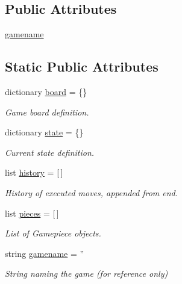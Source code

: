 \subsection*{Public Attributes}
\begin{DoxyCompactItemize}
\item 
\hyperlink{classgg__arch_1_1boardgame_1_1_boardgame_add740b057e0253407caaecd570f67291}{gamename}
\end{DoxyCompactItemize}
\subsection*{Static Public Attributes}
\begin{DoxyCompactItemize}
\item 
dictionary \hyperlink{classgg__arch_1_1boardgame_1_1_boardgame_a4abfdbb15a05a6278d9de43f54e46966}{board} = \{\}
\begin{DoxyCompactList}\small\item\em Game board definition. \end{DoxyCompactList}\item 
dictionary \hyperlink{classgg__arch_1_1boardgame_1_1_boardgame_a16f3034f66bd2ced22229b5798b8facc}{state} = \{\}
\begin{DoxyCompactList}\small\item\em Current state definition. \end{DoxyCompactList}\item 
list \hyperlink{classgg__arch_1_1boardgame_1_1_boardgame_aba6edf60f3fe1db68ba0942b286f6db1}{history} = \mbox{[}$\,$\mbox{]}
\begin{DoxyCompactList}\small\item\em History of executed moves, appended from end. \end{DoxyCompactList}\item 
list \hyperlink{classgg__arch_1_1boardgame_1_1_boardgame_a7425432d37ef9f90d9cc187f972c2052}{pieces} = \mbox{[}$\,$\mbox{]}
\begin{DoxyCompactList}\small\item\em List of Gamepiece objects. \end{DoxyCompactList}\item 
string \hyperlink{classgg__arch_1_1boardgame_1_1_boardgame_a2a5812dbb5fc2c63a6f551958006f1c7}{gamename} = ''
\begin{DoxyCompactList}\small\item\em String naming the game (for reference only) \end{DoxyCompactList}\item 

\end{DoxyCompactItemize}

